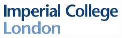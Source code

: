 

{
    \thispagestyle{plain}
    \tgherosfont
    \centering

    \includegraphics[width=6cm]{imperial_logo} \\[4mm]
    {\Large \thesisUniversity} \\[4mm]
    \textsf{\thesisUniversityDepartment} \\
    \textsf{\thesisUniversityGroup} \\

    \vfill
    {\LARGE \color{ctcolortitle}\textbf{\thesisTitle} \\[10mm]}
    {\Large \thesisName} \\

}
